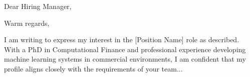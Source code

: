 \documentclass[11pt,a4paper,sans]{moderncv}
\begin{document}
\date{\today}
\opening{Dear Hiring Manager,}
\closing{Warm regards,}

\makelettertitle

I am writing to express my interest in the [Position Name] role as described. With a PhD in Computational Finance and professional experience developing machine learning systems in commercial environments, I am confident that my profile aligns closely with the requirements of your team...


\makeletterclosing
\end{document}

